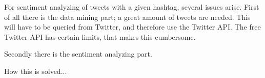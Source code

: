 \documentclass[Main]{subfiles}
\begin{document}
For sentiment analyzing of tweets with a given hashtag, several issues arise. First of all there is the data mining part; a great amount of tweets are needed. This will have to be queried from Twitter, and therefore use the Twitter API. The free Twitter API has certain limits, that makes this cumbersome. 

Secondly there is the sentiment analyzing part. 



How this is solved...
\end{document}
